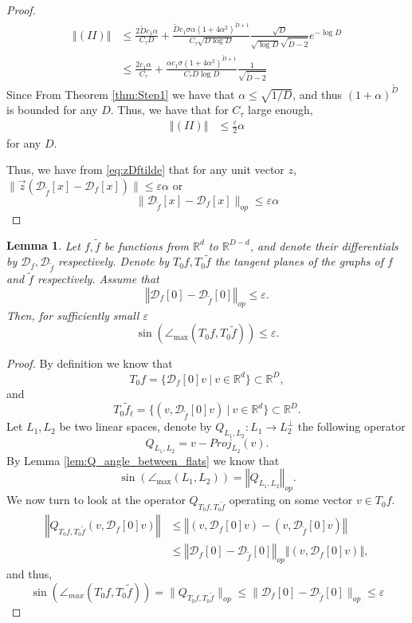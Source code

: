 \documentclass[12pt]{article}
\newtheorem{Lemma}[Theorem]{Lemma}
\theoremstyle{remark}
\newcommand{\RR}{\mathbb{R}}
\newcommand{\DD}{\mathcal{D}}
\newcommand{\eps}{\varepsilon}
\newcommand{\norm}[1]{\left\Vert #1 \right\Vert}
\newcommand{\wtilde}[1]{\widetilde{#1}}
\newcommand{\lrbrackets}[1]{\left( #1 \right)}
\newcommand{\maxangle}{\angle_{\max}}
\newcommand{\stau}{\tau}
\begin{document}
\begin{appendices}
\begin{proof}
\begin{align*}
\norm{(II)} &\leq  \frac{2\wtilde Dc_1 \alpha}{C_\stau D} + \frac{\wtilde Dc_1 \sigma\alpha ( 1 + 4\alpha^2)^{\wtilde D+1}}
{C_\stau \sqrt{D\log D}} \frac{\sqrt{D}}{\sqrt{\log D} \sqrt{\wtilde D-2}}e^{-\log D}
\\
&\leq \frac{2c_1 \alpha}{C_\stau } + \frac{\alpha c_1 \sigma ( 1 + 4\alpha^2)^{\wtilde D+1}}
{C_\stau D\log D} \frac{1}{\sqrt{\wtilde D-2}}
\end{align*}
Since From Theorem \ref{thm:Step1} we have that $\alpha \leq \sqrt{ 1/D}$, and thus 
$( 1 + \alpha)^{\wtilde D}$ is bounded for any $D$. Thus, we have that for $C_\stau$ large enough, 
\begin{align}
\norm{(II)}&\leq \frac{\eps}{2}\alpha
\end{align}
for any $D$.

Thus, we have from \eqref{eq:zDftilde} that for any unit vector $z$, $\|\vec{z}( \DD_{\wtilde{f}}[x] - \DD_f[x])\| \leq \eps\alpha$
or 
\[
\| \DD_{\wtilde{f}}[x] - \DD_{f}[x]\|_{op} \leq \eps\alpha
\]
\end{proof}


\begin{Lemma}\label{lem:Diff_Tf_bound}
	Let $ f, \tilde f $ be functions from $ \RR^d $ to $ \RR^{D-d} $, and denote their differentials by $ \DD_f, \DD_{\wtilde f} $ respectively.
	Denote by $ T_0 f, T_0 \wtilde f $ the tangent planes of the graphs of $ f $ and $ \wtilde f $ respectively.
	Assume that
	\[
	\norm{\DD_f[0] - \DD_{\tilde f}[0]}_{op}\leq \varepsilon 
	.\]
	Then, for sufficiently small $ \varepsilon $
	\[
	\sin(\maxangle(T_0 f, T_0 \wtilde{f})) \leq  \varepsilon 
	.\]
\end{Lemma}

\begin{proof}
	By definition we know that
	\[
	T_0 f = \{ \DD_{f}[0]v ~|~ v\in \RR^d \} \subset \RR^D
	,\]
	and
	\[
	T_0 \wtilde f_\ell = \{ (v, \DD_{\wtilde f}[0]v) ~|~ v\in \RR^d \} \subset \RR^D
	.\] 
	Let $ L_1, L_2 $ be two linear spaces, denote by $ Q_{L_1, L_2} :L_1\to L_2^\perp $  the following operator
	\[
	Q_{L_1, L_2} = {v - Proj_{L_2}(v)}
	.\]
	By Lemma \ref{lem:Q_angle_between_flats} we know that 
	\[
	\sin(\maxangle\lrbrackets{L_1, L_2}) = \norm{Q_{L_1, L_2}}_{op}
	.\]
	We now turn to look at the operator $ Q_{T_0 f, T_0 \wtilde f } $ operating on some vector $ v\in T_0 f $.
	\begin{align*}
	\norm{Q_{T_0 f, T_0 \wtilde f}(v,\DD_{f}[0]v )} 
	&\leq 
	\norm{(v,\DD_{f}[0]v ) - (v,\DD_{\wtilde f}[0]v )}\\
	&\leq 
	\norm{\DD_{f}[0] - \DD_{\wtilde f}[0]}_{op}\norm{(v,\DD_{f}[0]v)}
	,\end{align*}
	and thus,
	\[
	\sin (\angle_{max}(T_0 f, T_0 \wtilde f ))  = \|Q_{T_0 f, T_0 \wtilde f}\|_{op} \leq \|\DD_{f}[0] - \DD_{\wtilde f}[0]\|_{op} \leq  \varepsilon  
	\]
\end{proof}


\end{appendices}
\end{document}
